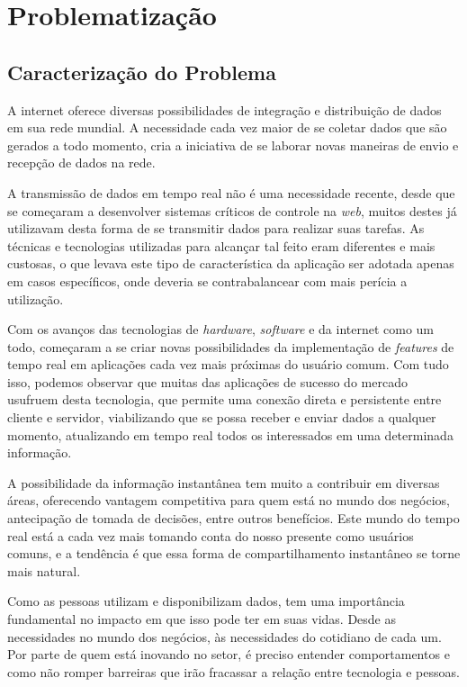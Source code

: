 \chapter{Problematização}
\section{Caracterização do Problema}
A internet oferece diversas possibilidades de integração e distribuição de dados em sua rede mundial. A necessidade cada vez maior de se coletar dados que são gerados a todo momento, cria a iniciativa de se laborar novas maneiras de envio e recepção de dados na rede.

A transmissão de dados em tempo real não é uma necessidade recente, desde que se começaram a desenvolver sistemas críticos de controle na \textit{web}, muitos destes já utilizavam desta forma de se transmitir dados para realizar suas tarefas. As técnicas e tecnologias utilizadas para alcançar tal feito eram diferentes e mais custosas, o que levava este tipo de característica da aplicação ser adotada apenas em casos específicos, onde deveria se contrabalancear com mais perícia a utilização.

Com os avanços das tecnologias de \textit{hardware}, \textit{software} e da internet como um todo, começaram a se criar novas possibilidades da implementação de \textit{features} de tempo real em aplicações cada vez mais próximas do usuário comum. Com tudo isso, podemos observar que muitas das aplicações de sucesso do mercado usufruem desta tecnologia, que permite uma conexão direta e persistente entre cliente e servidor, viabilizando que se possa receber e enviar dados a qualquer momento, atualizando em tempo real todos os interessados em uma determinada informação.

A possibilidade da informação instantânea tem muito a contribuir em diversas áreas, oferecendo vantagem competitiva para quem está no mundo dos negócios, antecipação de tomada de decisões, entre outros benefícios. Este mundo do tempo real está a cada vez mais tomando conta do nosso presente como usuários comuns, e a tendência é que essa forma de compartilhamento instantâneo se torne mais natural.

Como as pessoas utilizam e disponibilizam dados, tem uma importância fundamental no impacto em que isso pode ter em suas vidas. Desde as necessidades no mundo dos negócios, às necessidades do cotidiano de cada um. Por parte de quem está inovando no setor, é preciso entender comportamentos e como não romper barreiras que irão fracassar a relação entre tecnologia e pessoas. 

